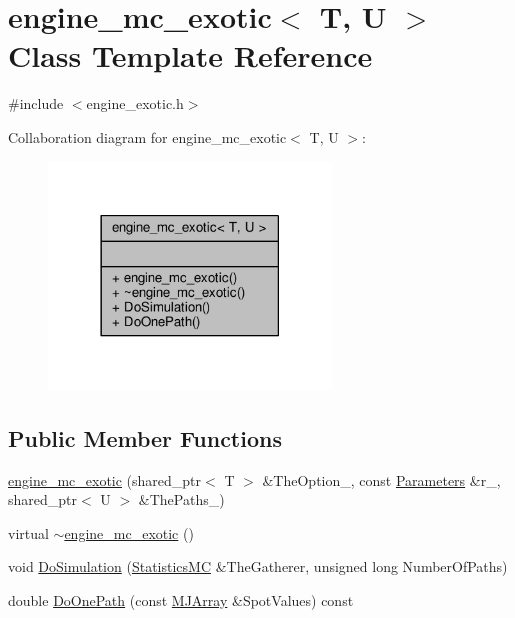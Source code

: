 \hypertarget{classengine__mc__exotic}{}\section{engine\+\_\+mc\+\_\+exotic$<$ T, U $>$ Class Template Reference}
\label{classengine__mc__exotic}


{\ttfamily \#include $<$engine\+\_\+exotic.\+h$>$}



Collaboration diagram for engine\+\_\+mc\+\_\+exotic$<$ T, U $>$\+:
\nopagebreak
\begin{figure}[H]
\begin{center}
\leavevmode
\includegraphics[width=213pt]{classengine__mc__exotic__coll__graph}
\end{center}
\end{figure}
\subsection*{Public Member Functions}
\begin{DoxyCompactItemize}
\item 
\hyperlink{classengine__mc__exotic_ac84b055a4f57a3e08d5a0a0093167b53}{engine\+\_\+mc\+\_\+exotic} (shared\+\_\+ptr$<$ T $>$ \&The\+Option\+\_\+, const \hyperlink{classParameters}{Parameters} \&r\+\_\+, shared\+\_\+ptr$<$ U $>$ \&The\+Paths\+\_\+)
\item 
virtual \hyperlink{classengine__mc__exotic_ab36a687185223f73a36bfe2f1ba6f75d}{$\sim$engine\+\_\+mc\+\_\+exotic} ()
\item 
void \hyperlink{classengine__mc__exotic_a2987115b991c16b43f63dc9f6310ab66}{Do\+Simulation} (\hyperlink{classStatisticsMC}{Statistics\+MC} \&The\+Gatherer, unsigned long Number\+Of\+Paths)
\item 
double \hyperlink{classengine__mc__exotic_a39ee74fd980343bba205ddd7ba482455}{Do\+One\+Path} (const \hyperlink{classMJArray}{M\+J\+Array} \&Spot\+Values) const
\end{DoxyCompactItemize}


